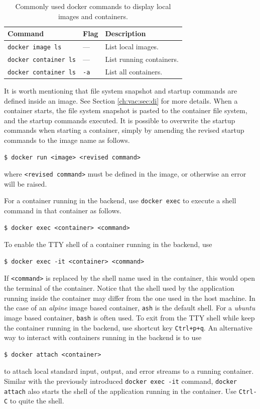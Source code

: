 \begin{table}
	\centering \caption{Commonly used docker commands to display local images and containers.}\label{ch:vac:tab:listcontainer}
	\begin{tabularx}{\textwidth}{llX}
		\hline
		Command & Flag & Description \\ \hline
        \verb|docker image ls| & --- & List local images. \\ 
        \verb|docker container ls| & --- & List running containers. \\ 
        \verb|docker container ls| & \verb|-a| & List all containers. \\
		\hline
	\end{tabularx}
\end{table}

It is worth mentioning that file system snapshot and startup commands are defined inside an image. See Section \ref{ch:vac:sec:di} for more details. When a container starts, the file system snapshot is pasted to the container file system, and the startup commands executed. It is possible to overwrite the startup commands when starting a container, simply by amending the revised startup commands to the image name as follows.
\begin{lstlisting}
$ docker run <image> <revised command>
\end{lstlisting}
where \verb|<revised command>| must be defined in the image, or otherwise an error will be raised.

For a container running in the backend, use \verb|docker exec| to execute a shell command in that container as follows.
\begin{lstlisting}
$ docker exec <container> <command>
\end{lstlisting}
To enable the TTY shell of a container running in the backend, use
\begin{lstlisting}
$ docker exec -it <container> <command>
\end{lstlisting}
If \verb|<command>| is replaced by the shell name used in the container, this would open the terminal of the container. Notice that the shell used by the application running inside the container may differ from the one used in the host machine. In the case of an \textit{alpine} image based container, \verb|ash| is the default shell. For a \textit{ubuntu} image based container, \verb|bash| is often used. To exit from the TTY shell while keep the container running in the backend, use shortcut key \verb|Ctrl+p+q|. An alternative way to interact with containers running in the backend is to use
\begin{lstlisting}
$ docker attach <container>
\end{lstlisting}
to attach local standard input, output, and error streams to a running container. Similar with the previously introduced \texttt{docker exec -it} command, \texttt{docker attach} also starts the shell of the application running in the container. Use \verb|Ctrl-C| to quite the shell.

